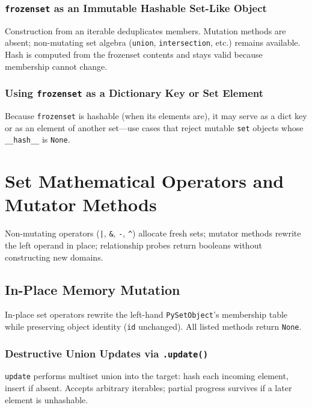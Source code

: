\documentclass[a4paper,twoside]{report}
\begin{document}
\subsubsection{\texttt{frozenset} as an Immutable Hashable Set-Like Object}

Construction from an iterable deduplicates members. Mutation methods are absent; non-mutating set algebra (\texttt{union}, \texttt{intersection}, etc.) remains available. Hash is computed from the frozenset contents and stays valid because membership cannot change.

\subsubsection{Using \texttt{frozenset} as a Dictionary Key or Set Element}

Because \texttt{frozenset} is hashable (when its elements are), it may serve as a dict key or as an element of another set---use cases that reject mutable \texttt{set} objects whose \texttt{\_\_hash\_\_} is \texttt{None}.


\section{Set Mathematical Operators and Mutator Methods}

Non-mutating operators (\texttt{|}, \texttt{\&}, \texttt{-}, \texttt{\textasciicircum{}}) allocate fresh sets; mutator methods rewrite the left operand in place; relationship probes return booleans without constructing new domains.




\subsection{In-Place Memory Mutation}

In-place set operators rewrite the left-hand \texttt{PySetObject}'s membership table while preserving object identity (\texttt{id} unchanged). All listed methods return \texttt{None}.

\subsubsection{Destructive Union Updates via \texttt{.update()}}

\texttt{update} performs multiset union into the target: hash each incoming element, insert if absent. Accepts arbitrary iterables; partial progress survives if a later element is unhashable.
\end{document}
